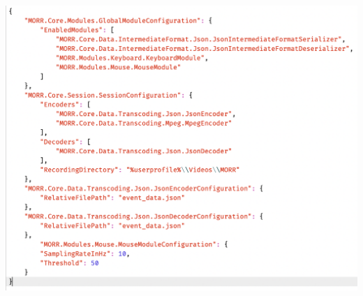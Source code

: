 \documentclass[aspectratio=169]{beamer}
\begin{document}
   \begin{frame}
		\includegraphics[width=0.8\linewidth]{resources/ConfigExample.png}
   \end{frame}
\end{document}
